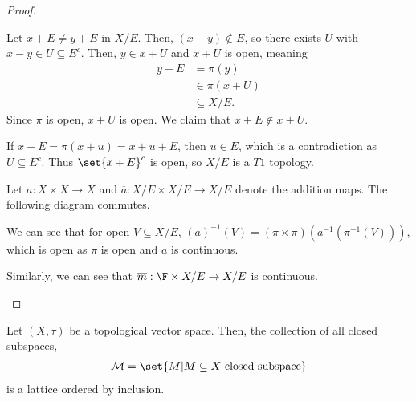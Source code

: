 \documentclass[10pt]{mypackage}
\begin{document}
\begin{proof}
\begin{enumerate}[(1)]
      Let $x+E\neq y+E$ in $X/E$. Then, $\left(x-y\right)\notin E$, so there exists $U$ with $x-y\in U\subseteq E^{c}$. Then, $y\in x+U$ and $x+U$ is open, meaning
      \begin{align*}
        y+E &= \pi(y)\\
            &\in \pi\left(x+U\right)\\
            &\subseteq X/E.
      \end{align*}
      Since $\pi$ is open, $x+U$ is open. We claim that $x+E\notin x+U$.\newline

      If $x+E = \pi\left(x+u\right) = x+u+E$, then $u\in E$, which is a contradiction as $U\subseteq E^{c}$. Thus $\set{x+E}^{c}$ is open, so $X/E$ is a $T1$ topology.\newline

      Let $a : X\times X\rightarrow X$ and $\overline{a}: X/E\times X/E\rightarrow X/E$ denote the addition maps. The following diagram commutes.
      \begin{center}
      \end{center}
      We can see that for open $V\subseteq X/E$, $\left(\overline{a}\right)^{-1}\left(V\right) = \left(\pi\times\pi\right)\left(a^{-1}\left(\pi^{-1}\left(V\right)\right)\right)$, which is open as $\pi$ is open and $a$ is continuous.\newline

      Similarly, we can see that $\overline{m}:\F\times X/E\rightarrow X/E$ is continuous.
  \end{enumerate}
\end{proof}
\begin{proposition}
  Let $\left(X,\tau\right)$ be a topological vector space. Then, the collection of all closed subspaces, 
  \begin{align*}
    \mathcal{M} = \set{M| M\subseteq X\text{ closed subspace}}
  \end{align*}
  is a lattice ordered by inclusion.
\end{proposition}
\end{document}
